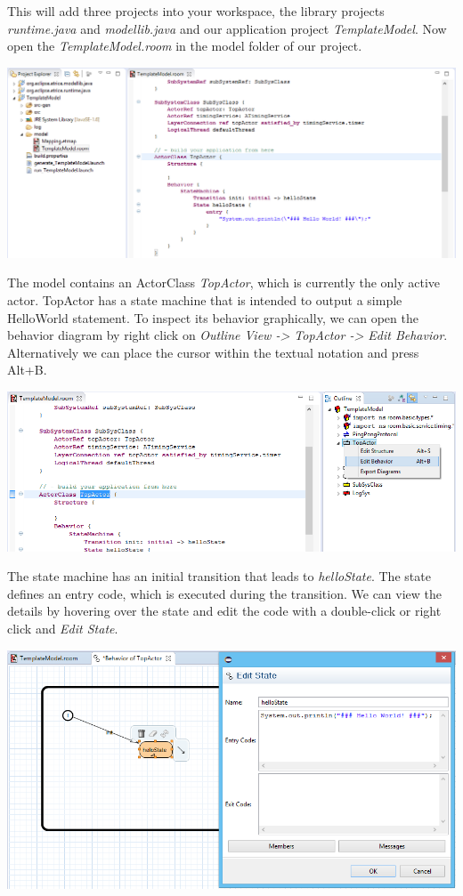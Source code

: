 This will add three projects into your workspace, the library projects \emph{runtime.java} and \emph{modellib.java} and our application project \emph{TemplateModel}. Now open the \emph{TemplateModel.room} in the model folder of our project.

\includegraphics[width=\textwidth]{images/014-after-wizard.png}

The model contains an ActorClass \emph{TopActor}, which is currently the only active actor. TopActor has a state machine that is intended to output a simple HelloWorld statement. To inspect its behavior graphically, we can open the behavior diagram by right click on \emph{Outline View -> TopActor -> Edit Behavior}. Alternatively we can place the cursor within the textual notation and press Alt+B.

\includegraphics[width=\textwidth]{images/014-open-hello-fsm.png}

The state machine has an initial transition that leads to \emph{helloState}. The state defines an entry code, which is executed during the transition. We can view the details by hovering over the state and edit the code with a double-click or right click and \emph{Edit State}.

\includegraphics[width=\textwidth]{images/014-hello-fsm.png}

